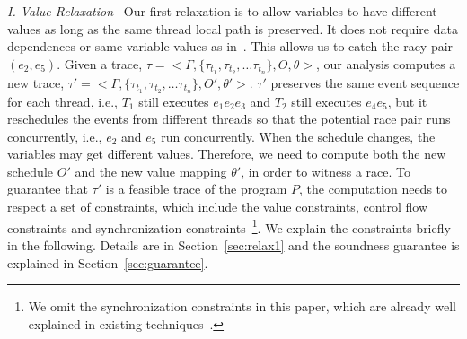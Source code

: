 \smallskip
\noindent
{\em I. Value Relaxation\ } Our first relaxation is to allow variables
to have different values as long as the same thread local path is preserved.
It does not require data dependences or same variable values as in~\cite{yannis, pldi14, Said:2011}.
This allows us to catch the racy pair $(e_2, e_5)$.
Given a trace, $\tau=<\Gamma , \{\tau_{t_1}, \tau_{t_2}, \dots \tau_{t_n} \},
 O, \theta>$, our analysis computes a new trace,  
$\tau'=<\Gamma , \{\tau_{t_1}, \tau_{t_2}, \dots \tau_{t_n} \}, O', \theta'>$.
 $\tau'$ preserves the same event sequence for each thread, i.e., $T_1$ still 
executes $e_1 e_2 e_3$ and $T_2$ still executes $e_4 e_5$, but it reschedules 
the events from different threads so that the potential race pair runs 
concurrently, i.e., $e_2$ and $e_5$ run concurrently. When the schedule 
changes, the variables may get different values. Therefore, we need to 
compute both the new schedule $O'$ and the new value mapping $\theta'$, in 
order to witness a race. To guarantee that $\tau'$ is a feasible trace of 
the program $P$, the computation needs to respect a set of constraints, 
which include the value constraints, control flow constraints and 
synchronization constraints~\footnote{We omit the synchronization constraints 
in this paper, which are already well explained in existing 
techniques~\cite{yannis, pldi14}.}. We explain the constraints 
briefly in the following. Details are in Section~\ref{sec:relax1} 
and the soundness guarantee is explained in Section~\ref{sec:guarantee}.











